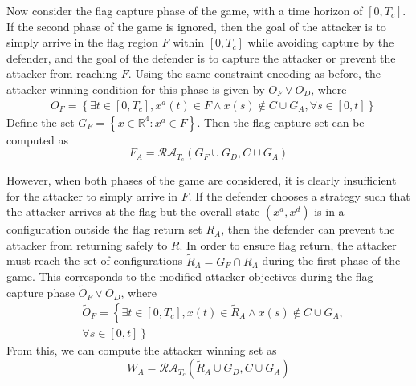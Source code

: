 \documentclass[letterpaper, 10 pt, conference]{ieeeconf}  %
\numberwithin{algorithm}{section}
\begin{document}
Now consider the flag capture phase of the game, with a time horizon of $[0,T_c]$.  If the second phase of the game is ignored, then the goal of the attacker is to simply arrive in the flag region $F$ within $[0,T_c]$ while avoiding capture by the defender, and the goal of the defender is to capture the attacker or prevent the attacker from reaching $F$.  Using the same constraint encoding as before, the attacker winning condition for this phase is given by
$O_F \vee O_D$, where
\begin{align*}
&O_F = \left\{\exists t \in [0,T_c], x^a(t) \in F \wedge x(s) \notin C \cup G_A, \forall s \in [0,t]\right\} 
\end{align*}
Define the set $G_F = \left\{x \in \mathbb{R}^4: x^a \in F \right\}$.  Then the flag capture set can be computed as
\begin{equation}
F_A = \mathcal{RA}_{T_c}(G_F \cup G_D, C \cup G_A)
\end{equation}

However, when both phases of the game are considered, it is clearly insufficient for the attacker to simply arrive in $F$.  If the defender chooses a strategy such that the attacker arrives at the flag but the overall state $(x^a, x^d)$ is in a configuration outside the flag return set $R_A$, then the defender can prevent the attacker from returning safely to $R$.  In order to ensure flag return, the attacker must reach the set of configurations $\tilde{R}_A = G_F \cap R_A$ during the first phase of the game.  This corresponds to the modified attacker objectives during the flag capture phase $\tilde{O}_F \vee O_D$, where
\begin{align*}
&\tilde{O}_F = \left\{\exists t \in [0,T_c], x(t) \in \tilde{R}_A \wedge x(s) \notin C \cup G_A, \right. \\
&\left. \forall s \in [0,t]\right\}
\end{align*}
From this, we can compute the attacker winning set as
\begin{equation}
W_A = \mathcal{RA}_{T_c}(\tilde{R}_A \cup G_D, C \cup G_A)
\end{equation}
\end{document}
